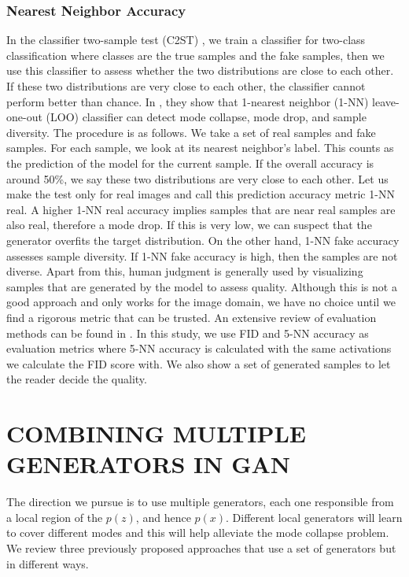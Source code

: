 \documentclass[a4paper,onesided,12pt]{report}
\begin{document}
\subsection{Nearest Neighbor Accuracy}
\label{subsec:nn}
In the classifier two-sample test (C2ST) \cite{lopez2016revisiting}, we train a classifier for two-class classification where classes are the true samples and the fake samples, then we use this classifier to assess whether the two distributions are close to each other. If these two distributions are very close to each other, the classifier cannot perform better than chance. In \cite{xu2018empirical}, they show that 1-nearest neighbor (1-NN) leave-one-out (LOO) classifier can detect mode collapse, mode drop, and sample diversity. The procedure is as follows. We take a set of real samples and fake samples. For each sample, we look at its nearest neighbor's label. This counts as the prediction of the model for the current sample. If the overall accuracy is around 50\%, we say these two distributions are very close to each other. Let us make the test only for real images and call this prediction accuracy metric 1-NN real. A higher 1-NN real accuracy implies samples that are near real samples are also real, therefore a mode drop. If this is very low, we can suspect that the generator overfits the target distribution. On the other hand, 1-NN fake accuracy assesses sample diversity. If 1-NN fake accuracy is high, then the samples are not diverse. 
Apart from this, human judgment is generally used by visualizing samples that are generated by the model to assess quality. Although this is not a good approach and only works for the image domain, we have no choice until we find a rigorous metric that can be trusted. An extensive review of evaluation methods can be found in \cite{borji2019pros}. In this study, we use FID and 5-NN accuracy as evaluation metrics where 5-NN accuracy is calculated with the same activations we calculate the FID score with. We also show a set of generated samples to let the reader decide the quality.


\chapter{COMBINING MULTIPLE GENERATORS IN GAN}
\label{chapter:multiple_gan}

The direction we pursue is to use multiple generators, each one responsible from a local region of the $p(z)$, and hence $p(x)$. Different local generators will learn to cover different modes and this will help alleviate the mode collapse problem. We review three previously proposed approaches that use a set of generators but in different ways.
\end{document}
